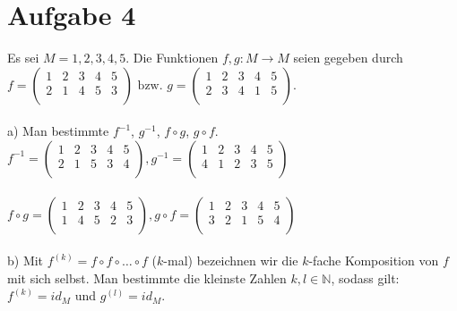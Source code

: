 \section*{Aufgabe 4}

Es sei $M = {1,2,3,4,5}$. Die Funktionen $f,g : M \rightarrow M$ seien gegeben durch\\

$f = \begin{pmatrix}
1 & 2 & 3 & 4 & 5\\
2 & 1 & 4 & 5 & 3\\
\end{pmatrix} \text{ bzw. } g = \begin{pmatrix}
1 & 2 & 3 & 4 & 5\\
2 & 3 & 4 & 1 & 5\\
\end{pmatrix}$.\\~\\

a) Man bestimmte $f^{-1}$, $g^{-1}$, $f \circ g$, $g \circ f$.\\

$f^{-1} = \begin{pmatrix}
1 & 2 & 3 & 4 & 5\\
2 & 1 & 5 & 3 & 4\\
\end{pmatrix}, g^{-1} = \begin{pmatrix}
1 & 2 & 3 & 4 & 5\\
4 & 1 & 2 & 3 & 5\\
\end{pmatrix}$\\~\\

$f \circ g = \begin{pmatrix}
1 & 2 & 3 & 4 & 5\\
1 & 4 & 5 & 2 & 3\\
\end{pmatrix}, g \circ f = \begin{pmatrix}
1 & 2 & 3 & 4 & 5\\
3 & 2 & 1 & 5 & 4\\
\end{pmatrix}$\\~\\

b) Mit $f^{(k)} = f \circ f \circ \dots \circ f$ ($k$-mal) bezeichnen wir die $k$-fache Komposition von $f$ mit sich selbst. Man bestimmte die kleinste Zahlen $k,l \in \mathbb{N}$, sodass gilt: $f^{(k)} = id_M$ und $g^{(l)} = id_M$.\\

